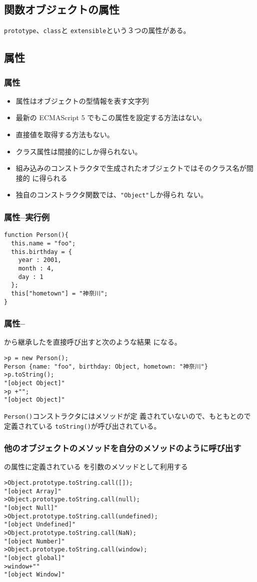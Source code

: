\subsection{関数オブジェクトの属性}
\begin{frame}[containsverbatim]
\texttt{prototype}、\texttt{class}と
 \texttt{extensible}という３つの属性がある。
\end{frame}
\subsection{\protect{}属性}
\begin{frame}[containsverbatim]
 \frametitle{\protect{}属性}
 \begin{itemize}
  \item {}属性はオブジェクトの型情報を表す文字列
  \item 最新の ECMAScript 5 でもこの属性を設定する方法はない。
  \item 直接値を取得する方法もない。
  \item クラス属性は間接的にしか得られない。
  \item 組み込みのコンストラクタで生成されたオブジェクトではそのクラス名が間接的
に得られる
  \item 独自のコンストラクタ関数では、\texttt{"Object"}しか得られ
ない。
 \end{itemize}
 \end{frame}
\begin{frame}[containsverbatim]
 \frametitle{\protect{}属性--実行例}
\begin{Verbatim}
function Person(){
  this.name = "foo";
  this.birthday = {
    year : 2001,
    month : 4,
    day : 1
  };
  this["hometown"] = "神奈川";
}
\end{Verbatim}
 \end{frame}
\begin{frame}[containsverbatim]
 \frametitle{\protect{}属性--\protect{}}
から継承したを直接呼び出すと次のような結果
 になる。
\begin{Verbatim}
>p = new Person();
Person {name: "foo", birthday: Object, hometown: "神奈川"}
>p.toString();
"[object Object]"
>p +"";
"[object Object]"
\end{Verbatim}
\texttt{Person()}コンストラクタにはメソッドが定
義されていないので、もともとので定義されている
 \texttt{toString()}が呼び出されている。
\end{frame}
\begin{frame}[containsverbatim]
 \frametitle{他のオブジェクトのメソッドを自分のメソッドのように呼び出す}
 の属性に定義されている
を引数のメソッドとして利用する
\begin{Verbatim}
>Object.prototype.toString.call([]);
"[object Array]"
>Object.prototype.toString.call(null);
"[object Null]"
>Object.prototype.toString.call(undefined);
"[object Undefined]"
>Object.prototype.toString.call(NaN);
"[object Number]"
>Object.prototype.toString.call(window);
"[object global]"
>window+""
"[object Window]"
\end{Verbatim}
\end{frame}
